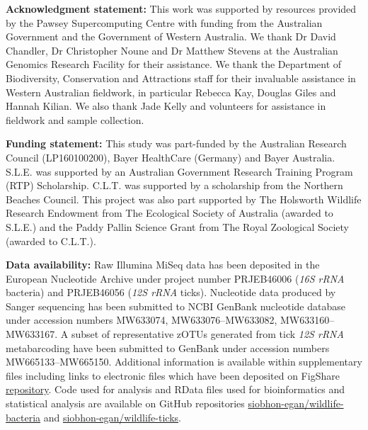 \documentclass[a4paper, nobind]{templates/ociamthesis}
\begin{document}
\vspace{5mm}

\textbf{Acknowledgment statement:}
This work was supported by resources provided by the Pawsey Supercomputing Centre with funding from the Australian Government and the Government of Western Australia.
We thank Dr David Chandler, Dr Christopher Noune and Dr Matthew Stevens at the Australian Genomics Research Facility for their assistance.
We thank the Department of Biodiversity, Conservation and Attractions staff for their invaluable assistance in Western Australian fieldwork, in particular Rebecca Kay, Douglas Giles and Hannah Kilian.
We also thank Jade Kelly and volunteers for assistance in fieldwork and sample collection.

\vspace{5mm}

\textbf{Funding statement:}
This study was part-funded by the Australian Research Council (LP160100200), Bayer HealthCare (Germany) and Bayer Australia.
S.L.E. was supported by an Australian Government Research Training Program (RTP) Scholarship.
C.L.T. was supported by a scholarship from the Northern Beaches Council.
This project was also part supported by The Holsworth Wildlife Research Endowment from The Ecological Society of Australia (awarded to S.L.E.) and the Paddy Pallin Science Grant from The Royal Zoological Society (awarded to C.L.T.).

\vspace{5mm}

\textbf{Data availability:}
Raw Illumina MiSeq data has been deposited in the European Nucleotide Archive under project number PRJEB46006 (\emph{16S rRNA} bacteria) and PRJEB46056 (\emph{12S rRNA} ticks).
Nucleotide data produced by Sanger sequencing has been submitted to NCBI GenBank nucleotide database under accession numbers MW633074, MW633076--MW633082, MW633160--MW633167.
A subset of representative zOTUs generated from tick \emph{12S rRNA} metabarcoding have been submitted to GenBank under accession numbers MW665133--MW665150.
Additional information is available within supplementary files including links to electronic files which have been deposited on FigShare \href{https://doi.org/10.6084/m9.figshare.14363627.v1}{repository}.
Code used for analysis and RData files used for bioinformatics and statistical analysis are available on GitHub repositories \href{https://github.com/siobhon-egan/wildlife-bacteria}{siobhon-egan/wildlife-bacteria} and \href{https://github.com/siobhon-egan/wildlife-ticks}{siobhon-egan/wildlife-ticks}.
\end{document}
